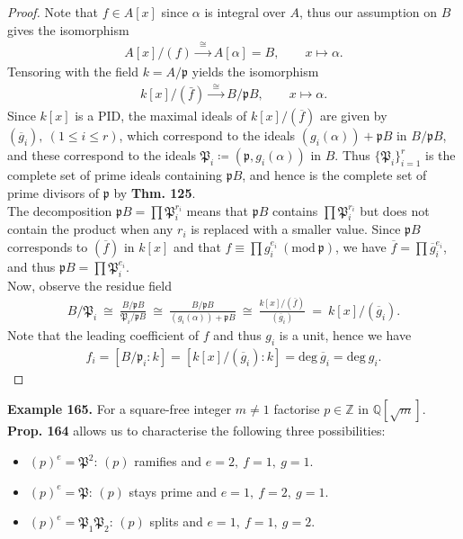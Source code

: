 \documentclass[12pt,a4paper,footinclude=true,headinclude=true]{scrbook} %
\newenvironment{example}[2][Example]
    { \begin{mdframed}[backgroundcolor=gray!20] \textbf{#1 #2.} }
    {  \end{mdframed}}
\begin{document}
\begin{proof}
    Note that $f\in A[x]$ since $\alpha$ is integral over $A$, thus our assumption on $B$ gives the isomorphism 
    \begin{align*}
        A[x]/(f)\xrightarrow{~~\cong~~} A[\alpha]=B,\qquad x\longmapsto\alpha.
    \end{align*}
    Tensoring with the field $k=A/\mathfrak{p}$ yields the isomorphism
    \begin{align*}
        k[x]/(\bar{f})\xrightarrow{~~\cong~~} B/\mathfrak{p}B,\qquad
        x\longmapsto\alpha.
    \end{align*}
    Since $k[x]$ is a PID, the maximal ideals of $k[x]/(\overline{f})$ are given by $(\overline{g}_i),\ (1\leq i\leq r)$, which correspond to the ideals $(g_i(\alpha))+\mathfrak{p}B$ in $B/\mathfrak{p}B$, and these correspond to the ideals $\mathfrak{P}_i\coloneqq(\mathfrak{p},g_i(\alpha))$ in $B$. Thus $\{\mathfrak{P}_i\}_{i=1}^r$ is the complete set of prime ideals containing $\mathfrak{p}B$, and hence is the complete set of prime divisors of $\mathfrak{p}$ by \textbf{Thm. 125}.\\
    The decomposition $\mathfrak{p}B=\prod\mathfrak{P}_i^{r_i}$ means that $\mathfrak{p}B$ contains $\prod\mathfrak{P}_i^{r_i}$ but does not contain the product when any $r_i$ is replaced with a smaller value. Since $\mathfrak{p}B$ corresponds to $(\overline{f})$ in $k[x]$ and that $f\equiv \prod g_i^{e_i}\ (\mathrm{mod}\ \mathfrak{p})$, we have $\overline{f}=\prod \overline{g}_i^{e_i}$, and thus $\mathfrak{p}B=\prod\mathfrak{P}_i^{e_i}$.\\
    Now, observe the residue field
    \begin{align*}
        B/\mathfrak{P}_i\ \cong\ \frac{B/\mathfrak{p}B}{\mathfrak{P}_i/\mathfrak{p}B}\ \cong\ 
        \frac{B/\mathfrak{p}B}{(g_i(\alpha))+\mathfrak{p}B}\ \cong\ 
        \frac{k[x]/(\overline{f})}{(\overline{g}_i)}\ =\ k[x]/(\overline{g}_i).
    \end{align*}
    Note that the leading coefficient of $f$ and thus $g_i$ is a unit, hence we have
    \begin{align*}
        f_i=[B/\mathfrak{p}_i:k]=[k[x]/(\overline{g}_i):k]=\mathrm{deg}\ \overline{g}_i=\mathrm{deg}\ g_i.
    \end{align*}
\end{proof}

\begin{example}{165}
    For a square-free integer $m\neq1$ factorise $p\in\mathbb{Z}$ in $\mathbb{Q}[\sqrt{m}]$. \textbf{Prop. 164} allows us to characterise the following three possibilities:
    \begin{itemize}
        \item[(i)] $(p)^e=\mathfrak{P}^2$: $(p)$ ramifies and $e=2,\ f=1,\ g=1$. 
        \item[(ii)] $(p)^e=\mathfrak{P}$: $(p)$ stays prime and $e=1,\ f=2,\ g=1$.
        \item[(iii)] $(p)^e=\mathfrak{P}_1\mathfrak{P}_2$: $(p)$ splits and $e=1,\ f=1,\ g=2$. 
    \end{itemize}
\end{example}
\end{document}
